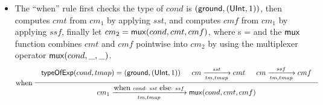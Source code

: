 \begin{itemize}
\[	{
		\begin{array}{c}
			id(r) = (v, m) \hspace{15pt} \typeofref(r, tmap) = (ft, ori)
		\end{array}
	}
	\]
	\item The ``when'' rule first checks the type of $cond$ is $({\sf ground}, ({\sf UInt}, 1))$, then computes $cmt$ from $cm_1$ by applying $sst$, and computes $cmf$ from $cm_1$ by applying $ssf$, finally let $cm_2 = {\sf mux}(cond, cmt, cmf)$, where s  =  and the ${\sf mux}$ function combines $cmt$ and $cmf$ pointwise into $cm_2$ by using the multiplexer operator ${\sf mux}(cond, \_, \_)$.
	\[
	\infer[when]
	{\seqq{cm_1 \xrightarrow[tm, tmap]{\mbox{when } cond:\ sst \mbox{ else}:\ ssf }  \mux(cond, cmt, cmf)}}
	{
		\begin{array}{c}
			\typeofexp(cond, tmap) = (\gtype, (\uint, 1))\hspace{15pt}
			cm \xrightarrow[tm, tmap]{sst} cmt \hspace{15pt} cm \xrightarrow[tm, tmap]{ssf} cmf
		\end{array}
	}	
	\]
\end{itemize}









